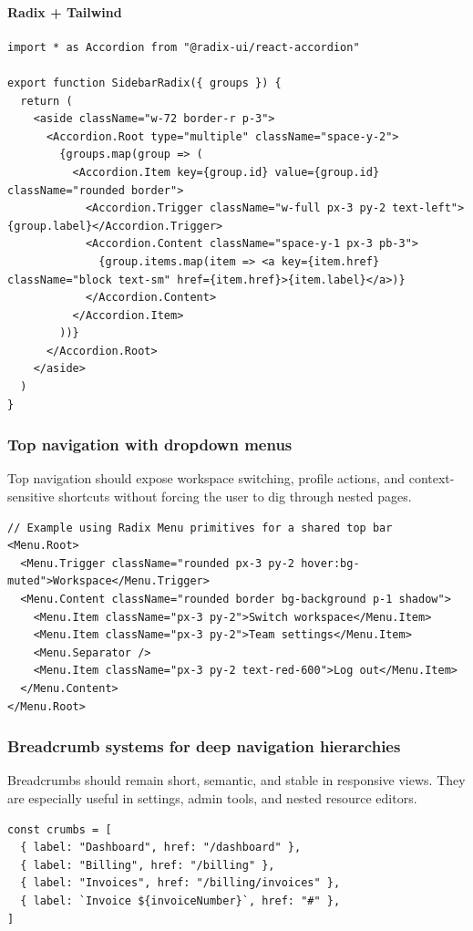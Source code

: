 \paragraph{Radix + Tailwind}
\begin{verbatim}
import * as Accordion from "@radix-ui/react-accordion"

export function SidebarRadix({ groups }) {
  return (
    <aside className="w-72 border-r p-3">
      <Accordion.Root type="multiple" className="space-y-2">
        {groups.map(group => (
          <Accordion.Item key={group.id} value={group.id} className="rounded border">
            <Accordion.Trigger className="w-full px-3 py-2 text-left">{group.label}</Accordion.Trigger>
            <Accordion.Content className="space-y-1 px-3 pb-3">
              {group.items.map(item => <a key={item.href} className="block text-sm" href={item.href}>{item.label}</a>)}
            </Accordion.Content>
          </Accordion.Item>
        ))}
      </Accordion.Root>
    </aside>
  )
}
\end{verbatim}

\subsubsection{Top navigation with dropdown menus}
Top navigation should expose workspace switching, profile actions, and context-sensitive shortcuts without forcing the user to dig through nested pages.

\begin{verbatim}
// Example using Radix Menu primitives for a shared top bar
<Menu.Root>
  <Menu.Trigger className="rounded px-3 py-2 hover:bg-muted">Workspace</Menu.Trigger>
  <Menu.Content className="rounded border bg-background p-1 shadow">
    <Menu.Item className="px-3 py-2">Switch workspace</Menu.Item>
    <Menu.Item className="px-3 py-2">Team settings</Menu.Item>
    <Menu.Separator />
    <Menu.Item className="px-3 py-2 text-red-600">Log out</Menu.Item>
  </Menu.Content>
</Menu.Root>
\end{verbatim}

\subsubsection{Breadcrumb systems for deep navigation hierarchies}
Breadcrumbs should remain short, semantic, and stable in responsive views. They are especially useful in settings, admin tools, and nested resource editors.

\begin{verbatim}
const crumbs = [
  { label: "Dashboard", href: "/dashboard" },
  { label: "Billing", href: "/billing" },
  { label: "Invoices", href: "/billing/invoices" },
  { label: `Invoice ${invoiceNumber}`, href: "#" },
]
\end{verbatim}

